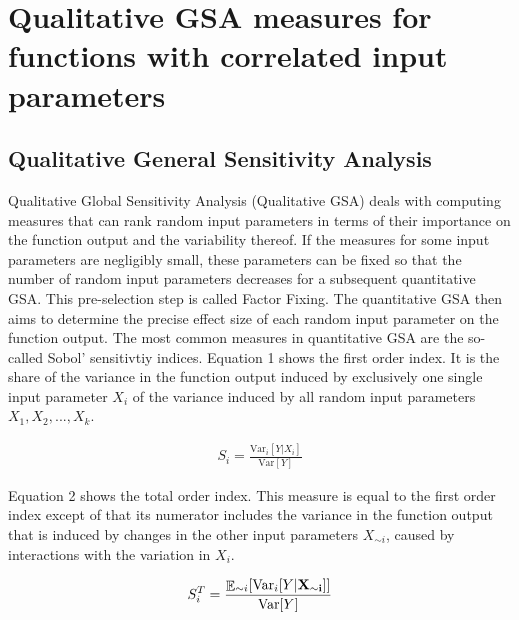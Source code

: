 \documentclass[a4paper,12pt]{article}
\DeclareMathOperator*{\E}{\mathbb{E}}
\begin{document}
\newpage %

\section{Qualitative GSA measures for functions with correlated input parameters}
\thispagestyle{plain} %


\cite{Saltelli.2008}

\cite{lemaire2013structural}

\cite{Smith.2014}

\subsection{Qualitative General Sensitivity Analysis}
\noindent
Qualitative Global Sensitivity Analysis (Qualitative GSA) deals with computing measures that can rank random input parameters in terms of their importance on the function output and the variability thereof. If the measures for some input parameters are negligibly small, these parameters can be fixed so that the number of random input parameters decreases for a subsequent quantitative GSA. This pre-selection step is called Factor Fixing. The quantitative GSA then aims to determine the precise effect size of each random input parameter on the function output. The most common measures in quantitative GSA are the so-called Sobol' sensitivtiy indices. Equation 1 shows the first order index. It is the share of the variance in the function output induced by exclusively one single input parameter $X_i$ of the variance induced by all random input parameters $X_1, X_2, ..., X_k$.


\begin{align}
S_i = \frac{\text{Var}_i[Y|X_i ]}{\text{Var}[Y]}
\end{align}

\noindent
Equation 2 shows the total order index. This measure is equal to the first order index except of that its numerator includes the variance in the function output that is induced by changes in the other input parameters $X_{\sim i}$, caused by interactions with the variation in $X_i$.

\begin{align}
S_{i}^T = \frac{\E_{\sim i}[\text{Var}_{i}[Y|\bold{X_{\sim i}]]}}{\text{Var}[Y]}
\end{align}
\end{document}
